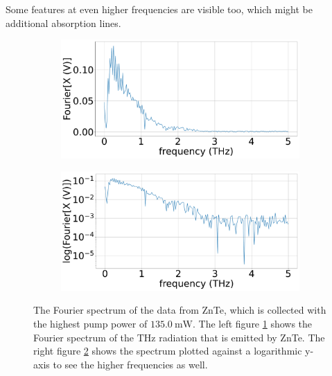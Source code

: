 Some features at even higher frequencies are visible too, which might be additional absorption lines.
\begin{figure}%
    \centering
    \begin{subfigure}{.5\textwidth}%
        \centering
        \includegraphics[width=\textwidth]{Plots/2_11_30_20normalFX.pdf}%
        \caption{}
        \label{fig:2_11_30_20_fft}%
    \end{subfigure}%
    \hfill%
    \begin{subfigure}{.5\textwidth}%
        \centering
        \includegraphics[width=\textwidth]{Plots/2_11_30_20normallog(FX).pdf}%
        \caption{}
        \label{fig:2_11_30_20_fft_log}%
    \end{subfigure}%
    \caption{The Fourier spectrum of the data from ZnTe, which is collected with the highest pump power of $\SI{135.0}{\milli\W}$.
    The left figure \ref{fig:2_11_30_20_fft} shows the Fourier spectrum of the $\si{\tera\hertz}$ radiation that is emitted by ZnTe.
    The right figure \ref{fig:2_11_30_20_fft_log} shows the spectrum plotted against a logarithmic y-axis to see the higher frequencies as well.}%
    \label{fig:fourier_znte}%
\end{figure}\FloatBarrier
